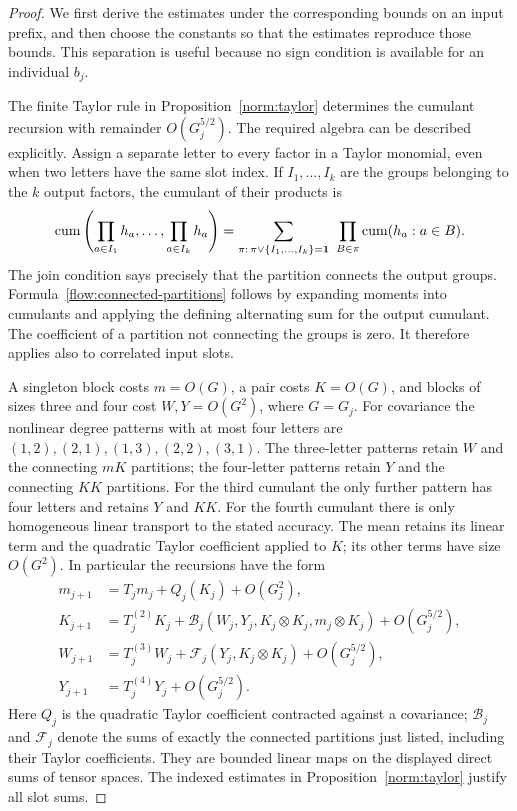\begin{proof}
We first derive the estimates under the corresponding bounds on an input
prefix, and then choose the constants so that the estimates reproduce
those bounds.  This separation is useful because no sign condition is
available for an individual $b_j$.

The finite Taylor rule in Proposition~\ref{norm:taylor} determines the
cumulant recursion with remainder $O(G_j^{5/2})$.  The required algebra can
be described explicitly.  Assign a separate letter to every factor in a
Taylor monomial, even when two letters have the same slot index.  If
$I_1,\ldots,I_k$ are the groups belonging to the $k$ output factors, the
cumulant of their products is
\begin{equation}\label{flow:connected-partitions}
 \operatorname{cum}\left(\prod_{a\in I_1}h_a,\ldots,
                 \prod_{a\in I_k}h_a\right)
 =\sum_{\pi:\,\pi\vee\{I_1,\ldots,I_k\}=\mathbf 1}
       \ \prod_{B\in\pi}\operatorname{cum}(h_a:a\in B).
\end{equation}
The join condition says precisely that the partition connects the output
groups.  Formula~\eqref{flow:connected-partitions} follows by expanding
moments into cumulants and applying the defining alternating sum for the
output cumulant.  The coefficient of a partition not connecting the groups
is zero.  It therefore applies also to correlated input slots.

A singleton block costs $m=O(G)$, a pair costs $K=O(G)$, and blocks of
sizes three and four cost $W,Y=O(G^2)$, where $G=G_j$.  For covariance the
nonlinear degree patterns with at most four letters are
$(1,2),(2,1),(1,3),(2,2),(3,1)$.
The three-letter patterns retain $W$ and the connecting $mK$ partitions;
the four-letter patterns retain $Y$ and the connecting $KK$ partitions.
For the third cumulant the only further pattern has four letters and
retains $Y$ and $KK$.  For the fourth cumulant there is only homogeneous
linear transport to the stated accuracy.  The mean retains its linear
term and the quadratic Taylor coefficient applied to $K$; its other
terms have size $O(G^2)$.  In particular the recursions have the form
\begin{align}
 m_{j+1}&=T_jm_j+Q_j(K_j)+O(G_j^2),\label{flow:mean-recursion}\\
 K_{j+1}&=T_j^{(2)}K_j+
       \mathcal B_j(W_j,Y_j,K_j\otimes K_j,m_j\otimes K_j)
       +O(G_j^{5/2}),\label{flow:cov-recursion}\\
 W_{j+1}&=T_j^{(3)}W_j+
       \mathcal F_j(Y_j,K_j\otimes K_j)+O(G_j^{5/2}),
       \label{flow:third-recursion}\\
 Y_{j+1}&=T_j^{(4)}Y_j+O(G_j^{5/2}).\label{flow:fourth-recursion}
\end{align}
Here $Q_j$ is the quadratic Taylor coefficient contracted against a
covariance; $\mathcal B_j$ and $\mathcal F_j$ denote the sums of exactly
the connected partitions just listed, including their Taylor
coefficients.  They are bounded linear maps on the displayed direct
sums of tensor spaces.  The indexed estimates in
Proposition~\ref{norm:taylor} justify all slot sums.


\end{proof}

